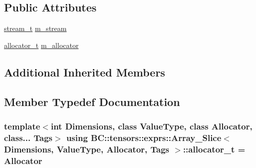 \subsection*{Public Attributes}
\begin{DoxyCompactItemize}
\item 
\hyperlink{classBC_1_1tensors_1_1exprs_1_1Array__Slice_a5395d730cd39e49ff6695a3294b4be5f}{stream\+\_\+t} \hyperlink{classBC_1_1tensors_1_1exprs_1_1Array__Slice_a88f9bafcc2e18f45ae9217d1f37215df}{m\+\_\+stream}
\item 
\hyperlink{classBC_1_1tensors_1_1exprs_1_1Array__Slice_aa0bee33cbbb4ea522d89aefa986b6584}{allocator\+\_\+t} \hyperlink{classBC_1_1tensors_1_1exprs_1_1Array__Slice_aa7dc5cd48d47896f87e7df27671d74b7}{m\+\_\+allocator}
\end{DoxyCompactItemize}
\subsection*{Additional Inherited Members}


\subsection{Member Typedef Documentation}
\subsubsection[{\texorpdfstring{allocator\+\_\+t}{allocator_t}}]{\setlength{\rightskip}{0pt plus 5cm}template$<$int Dimensions, class Value\+Type, class Allocator, class... Tags$>$ using {\bf B\+C\+::tensors\+::exprs\+::\+Array\+\_\+\+Slice}$<$ Dimensions, Value\+Type, {\bf Allocator}, Tags $>$\+::{\bf allocator\+\_\+t} =  {\bf Allocator}}\hypertarget{classBC_1_1tensors_1_1exprs_1_1Array__Slice_aa0bee33cbbb4ea522d89aefa986b6584}{}\label{classBC_1_1tensors_1_1exprs_1_1Array__Slice_aa0bee33cbbb4ea522d89aefa986b6584}

